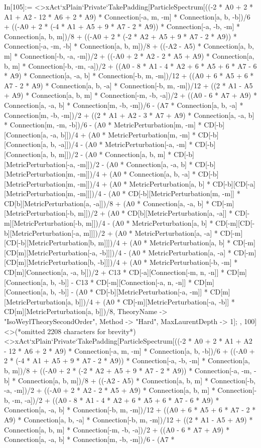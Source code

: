 In[105]:= <>xAct`xPlain`Private`TakePadding[ParticleSpectrum[((-2 * A0 + 2 * A1 + A2 - 12 * A6 + 2 * A9) * Connection[-a, m, -m] * Connection[a, b, -b])/6 + ((-A0 + 2 * (-4 * A1 + A5 + 9 * A7 - 2 * A9)) * Connection[-a, -b, -m] * Connection[a, b, m])/8 + ((-A0 + 2 * (-2 * A2 + A5 + 9 * A7 - 2 * A9)) * Connection[-a, -m, -b] * Connection[a, b, m])/8 + ((-A2 - A5) * Connection[a, b, m] * Connection[-b, -a, -m])/2 + ((-A0 + 2 * A2 - 2 * A5 + A9) * Connection[a, b, m] * Connection[-b, -m, -a])/2 + ((A0 - 8 * A1 - 4 * A2 + 6 * A5 + 6 * A7 - 6 * A9) * Connection[a, -a, b] * Connection[-b, m, -m])/12 + ((A0 + 6 * A5 + 6 * A7 - 2 * A9) * Connection[a, b, -a] * Connection[-b, m, -m])/12 + ((2 * A1 - A5 + A9) * Connection[a, b, m] * Connection[-m, -b, -a])/2 + ((A0 - 6 * A7 + A9) * Connection[a, -a, b] * Connection[m, -b, -m])/6 - (A7 * Connection[a, b, -a] * Connection[m, -b, -m])/2 + ((2 * A1 + A2 - 3 * A7 + A9) * Connection[a, -a, b] * Connection[m, -m, -b])/6 - (A0 * MetricPerturbation[m, -m] * CD[-b][Connection[a, -a, b]])/4 + (A0 * MetricPerturbation[m, -m] * CD[-b][Connection[a, b, -a]])/4 - (A0 * MetricPerturbation[-a, -m] * CD[-b][Connection[a, b, m]])/2 - (A0 * Connection[a, b, m] * CD[-b][MetricPerturbation[-a, -m]])/2 - (A0 * Connection[a, -a, b] * CD[-b][MetricPerturbation[m, -m]])/4 + (A0 * Connection[a, b, -a] * CD[-b][MetricPerturbation[m, -m]])/4 + (A0 * MetricPerturbation[a, b] * CD[-b][CD[-a][MetricPerturbation[m, -m]]])/4 - (A0 * CD[-b][MetricPerturbation[m, -m]] * CD[b][MetricPerturbation[a, -a]])/8 + (A0 * Connection[a, -a, b] * CD[-m][MetricPerturbation[-b, m]])/2 + (A0 * CD[b][MetricPerturbation[a, -a]] * CD[-m][MetricPerturbation[-b, m]])/4 - (A0 * MetricPerturbation[a, b] * CD[-m][CD[-b][MetricPerturbation[-a, m]]])/2 + (A0 * MetricPerturbation[a, -a] * CD[-m][CD[-b][MetricPerturbation[b, m]]])/4 + (A0 * MetricPerturbation[a, b] * CD[-m][CD[m][MetricPerturbation[-a, -b]]])/4 - (A0 * MetricPerturbation[a, -a] * CD[-m][CD[m][MetricPerturbation[b, -b]]])/4 + (A0 * MetricPerturbation[-b, -m] * CD[m][Connection[a, -a, b]])/2 + C13 * CD[-a][Connection[-m, n, -n]] * CD[m][Connection[a, b, -b]] - C13 * CD[-m][Connection[-a, n, -n]] * CD[m][Connection[a, b, -b]] - (A0 * CD[-b][MetricPerturbation[-a, -m]] * CD[m][MetricPerturbation[a, b]])/4 + (A0 * CD[-m][MetricPerturbation[-a, -b]] * CD[m][MetricPerturbation[a, b]])/8, TheoryName -> "IsoWeylTheorySecondOrder", Method -> "Hard", MaxLaurentDepth -> 1]; , 100]<>(*omitted 2208 characters for brevity*)<>xAct`xPlain`Private`TakePadding[ParticleSpectrum[((-2 * A0 + 2 * A1 + A2 - 12 * A6 + 2 * A9) * Connection[-a, m, -m] * Connection[a, b, -b])/6 + ((-A0 + 2 * (-4 * A1 + A5 + 9 * A7 - 2 * A9)) * Connection[-a, -b, -m] * Connection[a, b, m])/8 + ((-A0 + 2 * (-2 * A2 + A5 + 9 * A7 - 2 * A9)) * Connection[-a, -m, -b] * Connection[a, b, m])/8 + ((-A2 - A5) * Connection[a, b, m] * Connection[-b, -a, -m])/2 + ((-A0 + 2 * A2 - 2 * A5 + A9) * Connection[a, b, m] * Connection[-b, -m, -a])/2 + ((A0 - 8 * A1 - 4 * A2 + 6 * A5 + 6 * A7 - 6 * A9) * Connection[a, -a, b] * Connection[-b, m, -m])/12 + ((A0 + 6 * A5 + 6 * A7 - 2 * A9) * Connection[a, b, -a] * Connection[-b, m, -m])/12 + ((2 * A1 - A5 + A9) * Connection[a, b, m] * Connection[-m, -b, -a])/2 + ((A0 - 6 * A7 + A9) * Connection[a, -a, b] * Connection[m, -b, -m])/6 - (A7 * 